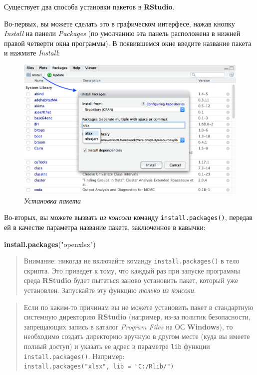 \documentclass[]{book}
\newenvironment{Shaded}{\begin{snugshade}}{\end{snugshade}}
\newcommand{\KeywordTok}[1]{\textcolor[rgb]{0.13,0.29,0.53}{\textbf{#1}}}
\newcommand{\StringTok}[1]{\textcolor[rgb]{0.31,0.60,0.02}{#1}}
\newcommand{\NormalTok}[1]{#1}
\begin{document}
Существует два способа установки пакетов в \textbf{RStudio}.

Во-первых, вы можете сделать это в графическом интерфесе, нажав кнопку
\emph{Install} на панели \emph{Packages} (по умолчанию эта панель
расположена в нижней правой четверти окна программы). В появившемся окне
введите название пакета и нажмите \emph{Install}:

\begin{figure}
\centering
\includegraphics{images/InstallPackages.png}
\caption{\emph{Установка пакета}}
\end{figure}

Во-вторых, вы можете вызвать \emph{из консоли} команду
\texttt{install.packages()}, передав ей в качестве параметра название
пакета, заключенное в кавычки:

\begin{Shaded}
\begin{Highlighting}[]
\KeywordTok{install.packages}\NormalTok{(}\StringTok{"openxlsx"}\NormalTok{)}
\end{Highlighting}
\end{Shaded}

\begin{quote}
Внимание: никогда не включайте команду \texttt{install.packages()} в
тело скрипта. Это приведет к тому, что каждый раз при запуске программы
среда \textbf{RStudio} будет пытаться заново установить пакет, который
уже установлен. Запускайте эту функцию \emph{только из консоли}.
\end{quote}

\begin{quote}
Если по каким-то причинам вы не можете установить пакет в стандартную
системную директорию \textbf{RStudio} (например, из-за политик
безопасности, запрещающих запись в каталог \emph{Program Files} на ОС
\textbf{Windows}), то необходимо создать директорию вручную в другом
месте (куда вы имеете полный доступ) и указать ее адрес в параметре
\texttt{lib} функции \texttt{install.packages()}. Например:
\texttt{install.packages("xlsx",\ lib\ =\ "C:/Rlib/")}
\end{quote}
\end{document}
